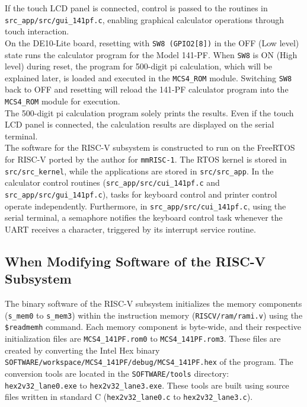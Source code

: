 If the touch LCD panel is connected, control is passed to the routines in \texttt{src\_app/src/gui\_141pf.c}, enabling graphical calculator operations through touch interaction.\\

On the DE10-Lite board, resetting with \texttt{SW8 (GPIO2[8])} in the OFF (Low level) state runs the calculator program for the Model 141-PF. When \texttt{SW8} is ON (High level) during reset, the program for 500-digit pi calculation, which will be explained later, is loaded and executed in the \texttt{MCS4\_ROM} module. Switching \texttt{SW8} back to OFF and resetting will reload the 141-PF calculator program into the \texttt{MCS4\_ROM} module for execution.\\

The 500-digit pi calculation program solely prints the results. Even if the touch LCD panel is connected, the calculation results are displayed on the serial terminal.\\

The software for the RISC-V subsystem is constructed to run on the FreeRTOS for RISC-V ported by the author for \texttt{mmRISC-1}. The RTOS kernel is stored in \texttt{src/src\_kernel}, while the applications are stored in \texttt{src/src\_app}. In the calculator control routines (\texttt{src\_app/src/cui\_141pf.c} and \texttt{src\_app/src/gui\_141pf.c}), tasks for keyboard control and printer control operate independently. Furthermore, in \texttt{src\_app/src/cui\_141pf.c}, using the serial terminal, a semaphore notifies the keyboard control task whenever the UART receives a character, triggered by its interrupt service routine.

\subsection{When Modifying Software of the RISC-V Subsystem}
The binary software of the RISC-V subsystem initializes the memory components (\texttt{s\_mem0} to \texttt{s\_mem3}) within the instruction memory (\texttt{RISCV/ram/rami.v}) using the \verb|$readmemh| command. Each memory component is byte-wide, and their respective initialization files are \texttt{MCS4\_141PF.rom0} to \texttt{MCS4\_141PF.rom3}. These files are created by converting the Intel Hex binary \texttt{SOFTWARE/workspace/MCS4\_141PF/debug/MCS4\_141PF.hex} of the program. The conversion tools are located in the \texttt{SOFTWARE/tools} directory: \texttt{hex2v32\_lane0.exe} to \texttt{hex2v32\_lane3.exe}. These tools are built using source files written in standard C (\texttt{hex2v32\_lane0.c} to \texttt{hex2v32\_lane3.c}).

